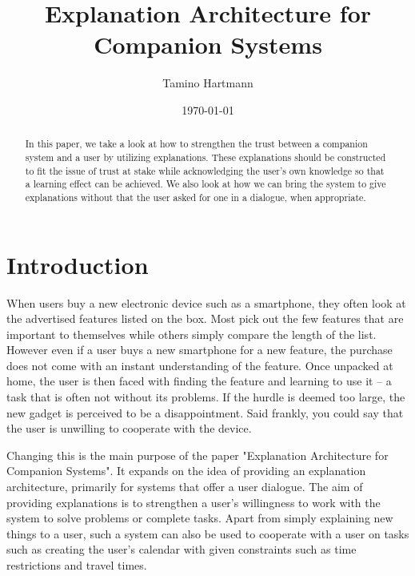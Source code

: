 \documentclass[a4paper]{article}
\begin{document}
\large

\title{Explanation Architecture for Companion Systems}
\author{Tamino Hartmann}
\date{\today}

\maketitle

\begin{abstract}
\normalsize
In this paper, we take a look at how to strengthen the trust between a companion system and a user by utilizing explanations. These explanations should be constructed to fit the issue of trust at stake while acknowledging the user's own knowledge so that a learning effect can be achieved. We also look at how we can bring the system to give explanations without that the user asked for one in a dialogue, when appropriate.
\end{abstract}

\section{Introduction}

When users buy a new electronic device such as a smartphone, they often look at the advertised features listed on the box. Most pick out the few features that are important to themselves while others simply compare the length of the list. However even if a user buys a new smartphone for a new feature, the purchase does not come with an instant understanding of the feature. Once unpacked at home, the user is then faced with finding the feature and learning to use it – a task that is often not without its problems. If the hurdle is deemed too large, the new gadget is perceived to be a disappointment. Said frankly, you could say that the user is unwilling to cooperate with the device.

Changing this is the main purpose of the paper "Explanation Architecture for Companion Systems"\cite{origin}. It expands on the idea of providing an explanation architecture, primarily for systems that offer a user dialogue. The aim of providing explanations is to strengthen a user's willingness to work with the system to solve problems or complete tasks. Apart from simply explaining new things to a user, such a system can also be used to cooperate with a user on tasks such as creating the user's calendar with given constraints such as time restrictions and travel times.
\end{document}
